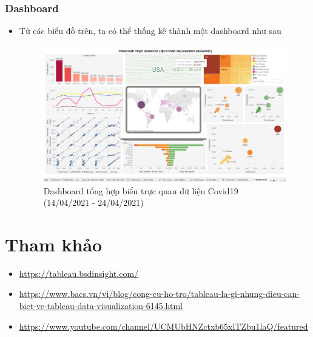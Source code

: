 \documentclass[a4paper, 12pt]{article}
\begin{document}
\subsubsection{Dashboard}

\begin{itemize}
    \item Từ các biểu đồ trên, ta có thể thống kê thành một dashboard như sau
    \begin{figure}[H]
        \begin{center}
            \includegraphics[scale=0.25]{img/dashboard1.png}
            \caption{Dashboard tổng hợp biểu trực quan dữ liệu Covid19 (14/04/2021 - 24/04/2021)}
        \end{center}
    \end{figure}
\end{itemize}

\clearpage

\section{Tham khảo}

\begin{itemize}
    \item \url{https://tableau.bsdinsight.com/}
    \item \url{https://www.bacs.vn/vi/blog/cong-cu-ho-tro/tableau-la-gi-nhung-dieu-can-biet-ve-tableau-data-visualization-6145.html}
    \item \url{https://www.youtube.com/channel/UCMUbHNZctxb65xlTZbu1laQ/featured}
\end{itemize}
\end{document}
